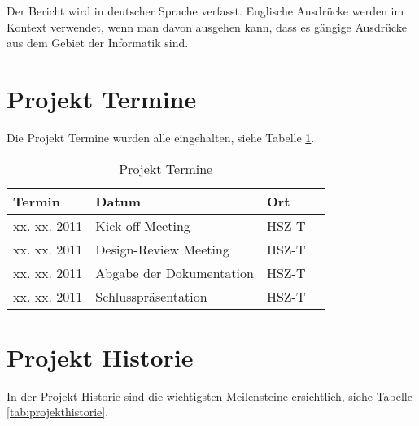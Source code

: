 \documentclass[abstracton, listof=totocnumbered,
bibliography=totocnumbered]{scrreprt}
\begin{document}
  Der Bericht wird in deutscher Sprache verfasst. Englische Ausdrücke werden im
  Kontext verwendet, wenn man davon ausgehen kann, dass es gängige Ausdrücke aus
  dem Gebiet der Informatik sind.
  
  \newpage
  
  \section{Projekt Termine}
  
  Die Projekt Termine wurden alle eingehalten, siehe Tabelle \ref{tab:termine}.
  \newline
  
  \begin{table}[h]
    \begin{center}
      \begin{tabular}{lp{7cm}ll}
        \toprule
        Termin & Datum & Ort \\
        \midrule
        xx. xx. 2011 & Kick-off Meeting & HSZ-T\\
        xx. xx. 2011 & Design-Review Meeting & HSZ-T\\
        xx. xx. 2011 & Abgabe der Dokumentation & HSZ-T\\
        xx. xx. 2011 & Schlusspräsentation & HSZ-T\\
        \bottomrule
      \end{tabular}
      \caption{Projekt Termine}
      \label{tab:termine}
    \end{center}
  \end{table}
  
  \section{Projekt Historie}
  
  In der Projekt Historie sind die wichtigsten Meilensteine ersichtlich, siehe
  Tabelle \ref{tab:projekthistorie}.
  \newline
  
\end{document}
